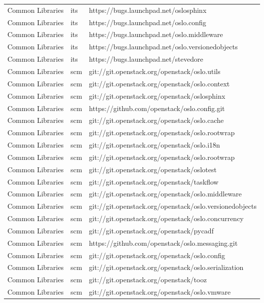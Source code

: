 \begin{center}
\begin{longtable}{|p{4cm}|p{1cm}|p{10cm}|}
Common Libraries&its&https://bugs.launchpad.net/oslosphinx\\
Common Libraries&its&https://bugs.launchpad.net/oslo.config\\
Common Libraries&its&https://bugs.launchpad.net/oslo.middleware\\
Common Libraries&its&https://bugs.launchpad.net/oslo.versionedobjects\\
Common Libraries&its&https://bugs.launchpad.net/stevedore\\
Common Libraries&scm&git://git.openstack.org/openstack/oslo.utils\\
Common Libraries&scm&git://git.openstack.org/openstack/oslo.context\\
Common Libraries&scm&git://git.openstack.org/openstack/oslosphinx\\
Common Libraries&scm&https://github.com/openstack/oslo.config.git\\
Common Libraries&scm&git://git.openstack.org/openstack/oslo.cache\\
Common Libraries&scm&git://git.openstack.org/openstack/oslo.rootwrap\\
Common Libraries&scm&git://git.openstack.org/openstack/oslo.i18n\\
Common Libraries&scm&git://git.openstack.org/openstack/oslo.rootwrap\\
Common Libraries&scm&git://git.openstack.org/openstack/oslotest\\
Common Libraries&scm&git://git.openstack.org/openstack/taskflow\\
Common Libraries&scm&git://git.openstack.org/openstack/oslo.middleware\\
Common Libraries&scm&git://git.openstack.org/openstack/oslo.versionedobjects\\
Common Libraries&scm&git://git.openstack.org/openstack/oslo.concurrency\\
Common Libraries&scm&git://git.openstack.org/openstack/pycadf\\
Common Libraries&scm&https://github.com/openstack/oslo.messaging.git\\
Common Libraries&scm&git://git.openstack.org/openstack/oslo.config\\
Common Libraries&scm&git://git.openstack.org/openstack/oslo.serialization\\
Common Libraries&scm&git://git.openstack.org/openstack/tooz\\
Common Libraries&scm&git://git.openstack.org/openstack/oslo.vmware\\

\end{longtable}
\end{center}
